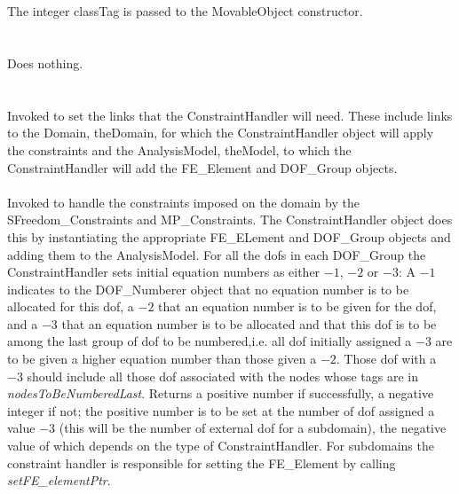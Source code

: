  \\
\\ 
The integer \p classTag is passed to the MovableObject constructor. \\

 \\
\\ 
Does nothing. \\

\\
 \\
Invoked to set the links that the ConstraintHandler will need. These
include links to the Domain, \p theDomain, for which the
ConstraintHandler object will apply the constraints and the
AnalysisModel, \p theModel, to which the ConstraintHandler will add
the FE\_Element and DOF\_Group objects. \\

 \\
Invoked to handle the constraints imposed on the domain by the
SFreedom\_Constraints and MP\_Constraints. The ConstraintHandler object does
this by instantiating the appropriate FE\_ELement and DOF\_Group objects 
and adding them to the AnalysisModel. For all the dofs in each
DOF\_Group the ConstraintHandler sets initial equation numbers as
either $-1$, $-2$ or $-3$: A $-1$ indicates to the DOF\_Numberer object
that no equation number is to be allocated for this dof, a $-2$ that
an equation number is to be given for the dof, and a $-3$ that an
equation number is to be allocated and that this dof is to
be among the last group of dof to be numbered,i.e. all dof initially
assigned a $-3$ are to be given a higher equation number than those
given a $-2$. Those dof with a $-3$ should include all those dof
associated with the nodes whose tags are in {\em
nodesToBeNumberedLast}. Returns a positive number if successfully, a
negative integer if not; the positive number is to be set at the
number of dof assigned a value $-3$ (this will be the number of
external dof for a subdomain), the negative value of which depends on
the type of ConstraintHandler. For subdomains the constraint handler
is responsible for setting the FE\_Element by calling {\em
setFE\_elementPtr}. \\    


